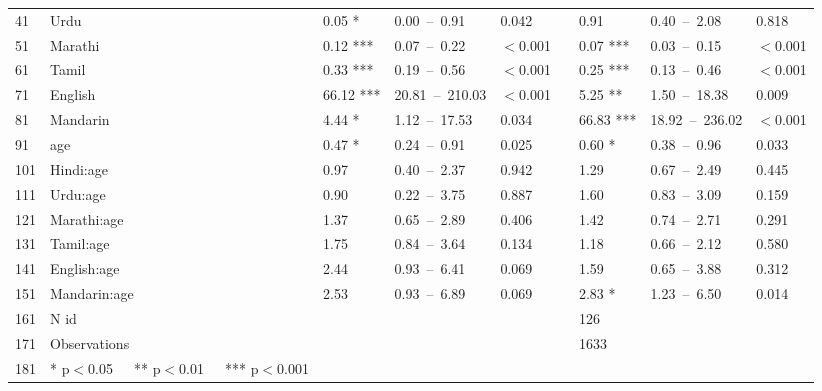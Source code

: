 \begin{table}[ht]
\begin{tabular}{}
  41 & Urdu & 0.05 * & 0.00 – 0.91 & 0.042 &  & 0.91 & 0.40 – 2.08 & 0.818 \\ 
  51 & Marathi & 0.12 *** & 0.07 – 0.22 & $<$0.001 &  & 0.07 *** & 0.03 – 0.15 & $<$0.001 \\ 
  61 & Tamil & 0.33 *** & 0.19 – 0.56 & $<$0.001 &  & 0.25 *** & 0.13 – 0.46 & $<$0.001 \\ 
  71 & English & 66.12 *** & 20.81 – 210.03 & $<$0.001 &  & 5.25 ** & 1.50 – 18.38 & 0.009 \\ 
  81 & Mandarin & 4.44 * & 1.12 – 17.53 & 0.034 &  & 66.83 *** & 18.92 – 236.02 & $<$0.001 \\ 
  91 & age & 0.47 * & 0.24 – 0.91 & 0.025 &  & 0.60 * & 0.38 – 0.96 & 0.033 \\ 
  101 & Hindi:age & 0.97 & 0.40 – 2.37 & 0.942 &  & 1.29 & 0.67 – 2.49 & 0.445 \\ 
  111 & Urdu:age & 0.90 & 0.22 – 3.75 & 0.887 &  & 1.60 & 0.83 – 3.09 & 0.159 \\ 
  121 & Marathi:age & 1.37 & 0.65 – 2.89 & 0.406 &  & 1.42 & 0.74 – 2.71 & 0.291 \\ 
  131 & Tamil:age & 1.75 & 0.84 – 3.64 & 0.134 &  & 1.18 & 0.66 – 2.12 & 0.580 \\ 
  141 & English:age & 2.44 & 0.93 – 6.41 & 0.069 &  & 1.59 & 0.65 – 3.88 & 0.312 \\ 
  151 & Mandarin:age & 2.53 & 0.93 – 6.89 & 0.069 &  & 2.83 * & 1.23 – 6.50 & 0.014 \\ 
  161 & N id &  &  &  &  & 126 &  &  \\ 
  171 & Observations &  &  &  &  & 1633 &  &  \\ 
  181 & * p$<$0.05   ** p$<$0.01   *** p$<$0.001 &  &  &  &  &  &  &  \\ 
   \hline
\end{tabular}
\end{table}
